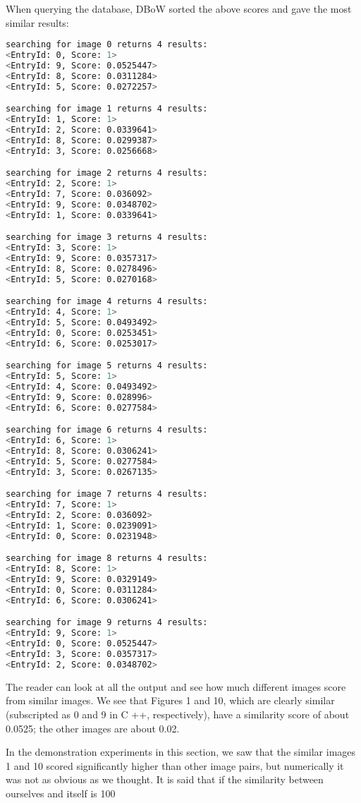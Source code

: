 When querying the database, DBoW sorted the above scores and gave the most similar results:
\begin{lstlisting}[language=sh,caption=终端输出：]
searching for image 0 returns 4 results:
<EntryId: 0, Score: 1>
<EntryId: 9, Score: 0.0525447>
<EntryId: 8, Score: 0.0311284>
<EntryId: 5, Score: 0.0272257>

searching for image 1 returns 4 results:
<EntryId: 1, Score: 1>
<EntryId: 2, Score: 0.0339641>
<EntryId: 8, Score: 0.0299387>
<EntryId: 3, Score: 0.0256668>

searching for image 2 returns 4 results:
<EntryId: 2, Score: 1>
<EntryId: 7, Score: 0.036092>
<EntryId: 9, Score: 0.0348702>
<EntryId: 1, Score: 0.0339641>

searching for image 3 returns 4 results:
<EntryId: 3, Score: 1>
<EntryId: 9, Score: 0.0357317>
<EntryId: 8, Score: 0.0278496>
<EntryId: 5, Score: 0.0270168>

searching for image 4 returns 4 results:
<EntryId: 4, Score: 1>
<EntryId: 5, Score: 0.0493492>
<EntryId: 0, Score: 0.0253451>
<EntryId: 6, Score: 0.0253017>

searching for image 5 returns 4 results:
<EntryId: 5, Score: 1>
<EntryId: 4, Score: 0.0493492>
<EntryId: 9, Score: 0.028996>
<EntryId: 6, Score: 0.0277584>

searching for image 6 returns 4 results:
<EntryId: 6, Score: 1>
<EntryId: 8, Score: 0.0306241>
<EntryId: 5, Score: 0.0277584>
<EntryId: 3, Score: 0.0267135>

searching for image 7 returns 4 results:
<EntryId: 7, Score: 1>
<EntryId: 2, Score: 0.036092>
<EntryId: 1, Score: 0.0239091>
<EntryId: 0, Score: 0.0231948>

searching for image 8 returns 4 results:
<EntryId: 8, Score: 1>
<EntryId: 9, Score: 0.0329149>
<EntryId: 0, Score: 0.0311284>
<EntryId: 6, Score: 0.0306241>

searching for image 9 returns 4 results:
<EntryId: 9, Score: 1>
<EntryId: 0, Score: 0.0525447>
<EntryId: 3, Score: 0.0357317>
<EntryId: 2, Score: 0.0348702>
\end{lstlisting}

The reader can look at all the output and see how much different images score from similar images. We see that Figures 1 and 10, which are clearly similar (subscripted as 0 and 9 in C ++, respectively), have a similarity score of about 0.0525; the other images are about 0.02.

In the demonstration experiments in this section, we saw that the similar images 1 and 10 scored significantly higher than other image pairs, but numerically it was not as obvious as we thought. It is said that if the similarity between ourselves and itself is 100%

